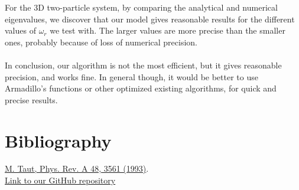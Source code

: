 \documentclass{article}
\begin{document}
	For the 3D two-particle system, by comparing the analytical and numerical eigenvalues, we discover that our model gives reasonable results for the different values of $\omega_r$ we test with. The larger values are more precise than the smaller ones, probably because of loss of numerical precision.\\\\

	In conclusion, our algorithm is not the most efficient, but it gives reasonable precision, and works fine. In general though, it would be better to use Armadillo's functions or other optimized existing algorithms, for quick and precise results.

\section{Bibliography}
	\href{http://prola.aps.org/abstract/PRA/v48/i5/p3561_1}{M. Taut, Phys. Rev. A 48, 3561 (1993)}.\\
	\href{https://github.com/emmernme/MENA-Compfys/tree/master/Project%202}{Link to our GitHub repository}
\end{document}
